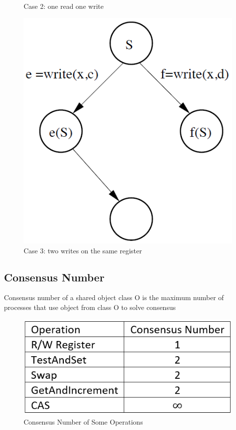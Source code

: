 \documentclass[twoside]{article}
\begin{document}
\begin{figure}[H]
\begin{minipage}{.3\textwidth}
    \caption{Case 2: one read one write}
    \end{minipage}    
    \begin{minipage}{.3\textwidth}\centering
    \includegraphics[scale=0.3]{case3.png}
    \caption{Case 3: two writes on the same register}
    \end{minipage}
    
    \label{fig:7}    
\end{figure}

\subsection{Consensus Number}
Consensus number of a shared object class O is the maximum number of processes that use object from class O to solve consensus

\begin{figure}[H]
    \centering
    \includegraphics[scale=0.75]{consensusnumber.png}
    \caption{Consensus Number of Some Operations}
    \label{fig:10}
\end{figure}
\end{document}
